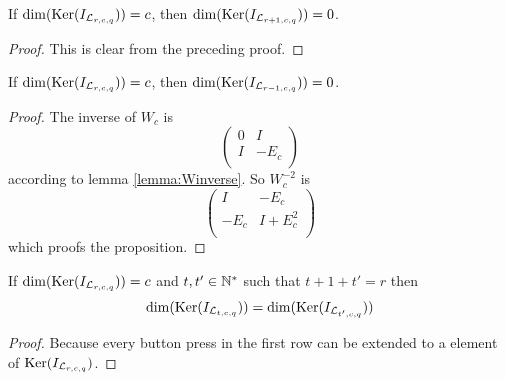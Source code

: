 \begin{corollary}
	If $\dim(\operatorname{Ker}(I_{\mathcal{L}_{r,c,q}})) = c$, then
	$\dim(\operatorname{Ker}(I_{\mathcal{L}_{r+1,c,q}})) = 0$. 
\end{corollary}

\begin{proof}
	This is clear from the preceding proof.
\end{proof}

\begin{proposition}
	If $\dim(\operatorname{Ker}(I_{\mathcal{L}_{r,c,q}})) = c$, then
	$\dim(\operatorname{Ker}(I_{\mathcal{L}_{r-1,c,q}})) = 0$.
\end{proposition}

\begin{proof}
	The inverse of $W_{c}$ is
	\[
 		\left(
		\begin{array}{cc}
			0 & I      \\
			I & -E_{c} \\
		\end{array}
		\right)
	\]
	according to lemma \ref{lemma:Winverse}. So $W_{c}^{-2}$ is
	\[
 		\left(
		\begin{array}{cc}
			I      & -E_{c}      \\
			-E_{c} & I+E_{c}^{2} \\
		\end{array}
		\right)
	\]
	which proofs the proposition.	
\end{proof}

\begin{proposition}
	If $\dim(\operatorname{Ker}(I_{\mathcal{L}_{r,c,q}})) = c$ and $t,t'\in\mathbb{N}^{*}$ such
	that $t + 1 + t' = r$ then
	\[
		\dim(\operatorname{Ker}(I_{\mathcal{L}_{t,c,q}})) = \dim(\operatorname{Ker}(I_{\mathcal{L}_{t',c,q}}))
	\]
\end{proposition}

\begin{proof}
	Because every button press in the first row can be extended to a element
	of $\operatorname{Ker}(I_{\mathcal{L}_{r,c,q}})$.
\end{proof}
